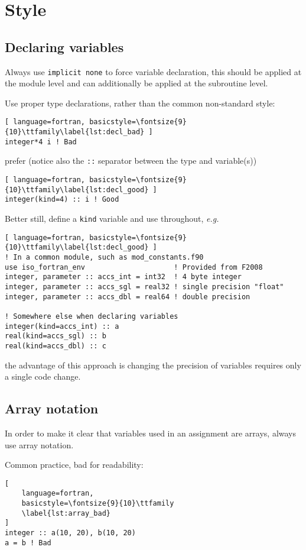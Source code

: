 \documentclass[11pt]{article}
\begin{document}
\section{Style}

\subsection{Declaring variables}
Always use \texttt{implicit none} to force variable declaration, this should be applied at the
module level and can additionally be applied at the subroutine level.

Use proper type declarations, rather than the common non-standard style:
\begin{lstlisting}[ language=fortran, basicstyle=\fontsize{9}{10}\ttfamily\label{lst:decl_bad} ]
integer*4 i ! Bad
\end{lstlisting}
prefer (notice also the \texttt{::} separator between the type and variable(s))
\begin{lstlisting}[ language=fortran, basicstyle=\fontsize{9}{10}\ttfamily\label{lst:decl_good} ]
integer(kind=4) :: i ! Good
\end{lstlisting}
Better still, define a \texttt{kind} variable and use throughout, \textit{e.g.}
\begin{lstlisting}[ language=fortran, basicstyle=\fontsize{9}{10}\ttfamily\label{lst:decl_good} ]
! In a common module, such as mod_constants.f90
use iso_fortran_env                     ! Provided from F2008
integer, parameter :: accs_int = int32  ! 4 byte integer
integer, parameter :: accs_sgl = real32 ! single precision "float"
integer, parameter :: accs_dbl = real64 ! double precision

! Somewhere else when declaring variables
integer(kind=accs_int) :: a
real(kind=accs_sgl) :: b
real(kind=accs_dbl) :: c
\end{lstlisting}
the advantage of this approach is changing the precision of variables requires only a single code
change.

\subsection{Array notation}
In order to make it clear that variables used in an assignment are arrays, always use array notation.

Common practice, bad for readability:
\begin{lstlisting}[
	language=fortran,
    basicstyle=\fontsize{9}{10}\ttfamily
    \label{lst:array_bad}
]
integer :: a(10, 20), b(10, 20)
a = b ! Bad
\end{lstlisting}
\end{document}

